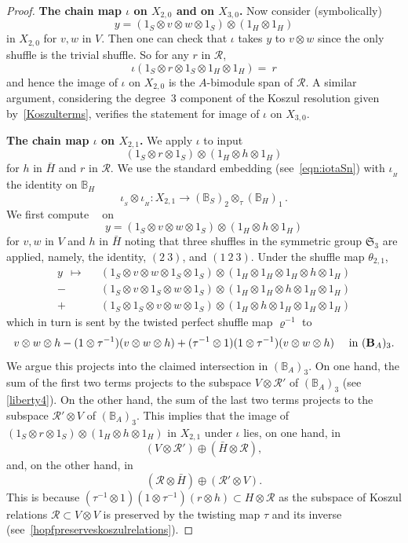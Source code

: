 \documentclass[11pt]{amsart}
\numberwithin{equation}{section}
\newcommand{\R}{\mathcal{R}}
\newcommand{\B}{{\bf B}} %
\newcommand{\BB}{\mathbb{B}} %
\DeclareMathOperator{\EZ}{EZ}
\DeclareMathOperator{\EZt}{{\EZ^{\tau}}}
\renewcommand{\_}[1]{\mbox{$_{\left( #1 \right)}$}}
\newcommand{\ot}{\otimes}
\newcommand{\ott}{\otimes_{\tau}}
\begin{document}
{\begin{proof}
  
{\bf The chain map $\iota$ on $X_{2,0}$ and on $X_{3,0}$.}
Now consider (symbolically) 
$$y=
(1_S\ot v\ot w \ot 1_S)
\ot (1_H\ot 1_H)
$$
in $X_{2,0}$
for $v,w$ in $V$.
Then one can check that $\iota$ takes $y$ to 
  $v \ot w $
since the only shuffle is the trivial shuffle.
  So for any $r$ in $\R$,
\begin{equation}\label{eqn:r-to-r}
  \iota(1_S\ot r\ot 1_S\ot 1_H\ot 1_H)
  =\ r 
  \end{equation}
  and hence the image of 
  $\iota$ on  $X_{2,0}$ is the $A$-bimodule span
  of $\R$.
A similar argument, considering the degree~3 component of 
the Koszul resolution given by~\cref{Koszulterms}, verifies the statement
for image of $\iota$ on $X_{3,0}$.

{\bf The chain map $\iota$ on $X_{2,1}$.} 
    We apply $\iota$ to input 
  $$(1_S\ot r \ot 1_S)\ot (1_H\ot h \ot 1_H)$$
  for $h$ in $\bar{H}$ 
and $r$ in $\R$. 
We use the standard embedding (see~\cref{eqn:iotaSn})
with $\iota_{_H}$ the identity on $\BB_H$
$$\iota_{_S}\ot \iota_{_H}: X_{2,1}\longrightarrow (\BB_S)_2\ott (\BB_H)_1\, . $$
  We first compute $\EZt$ on 
  $$y=(1_S\ot v\ot w \ot 1_S)\ot (1_H\ot h \ot 1_H)$$
  for $v,w$ in $V$ and $h$ in $\bar H$
 noting that three shuffles in the symmetric group $\mathfrak{S}_3$
 are applied, namely, the identity, $(2\ 3)$, and $(1\ 2\ 3)$.
 Under the shuffle map $\theta_{2,1}$,
 $$
  \begin{aligned}
   y\ \ 
    \mapsto \ \ \ & 
    (1_S\ot v\ot w\ot 1_S \ot 1_S)\ot (1_H\ot 1_H\ot 1_H\ot h \ot 1_H) \\
 - \, &  (1_S\ot v\ot 1_S\ot w \ot 1_S)\ot (1_H\ot 1_H\ot h\ot 1_H\ot 1_H) \\
   + \, &
        (1_S\ot 1_S\ot v\ot w \ot 1_S)\ot (1_H\ot h\ot 1_H\ot 1_H\ot 1_H) 
      \end{aligned}
      $$
which in turn is sent by the twisted perfect shuffle map
$\varrho^{-1}$
to
\begin{equation}\label{ThreeTerms}
\begin{aligned}
 v\ot w\ot h 
  -  (1\ot \tau^{-1})(v\ot w\ot h)
  +   (\tau^{-1}\ot 1)(1\ot \tau^{-1})(v\ot w\ot h) 
  \quad\text{ in $(\B_A)_3$.}
\end{aligned}
\end{equation}
We argue this projects into the claimed intersection in $(\BB_A)_3$.
On one hand, the sum of the first two terms 
projects to the subspace 
$V\ot \R'$ of $(\BB_A)_3$ (see \cref{liberty4}).
On the other hand, the sum of the
last two terms 
projects to the subspace $\R'\ot V$ of $(\BB_A)_3$.
%
This implies that the image
of $(1_S\ot r \ot 1_S)\ot (1_H\ot h \ot 1_H)$
in $X_{2,1}$
under $\iota$ lies, on one hand, in
$$(V\ot \R')
\oplus
( \bar H\ot \R),
$$
and, on the other hand,
in 
$$(\R\ot \bar H)
\oplus (\R'\ot V).
$$
This is because
$
(\tau^{-1}\ot 1)(1\ot \tau^{-1})(r\ot h)\subset H\ot \R
$
as the subspace of Koszul relations
$\R\subset V\ot V$ is preserved
by the twisting map $\tau$ and its inverse 
(see~\cref{hopfpreserveskoszulrelations}).
\end{proof}


}
\end{document}
